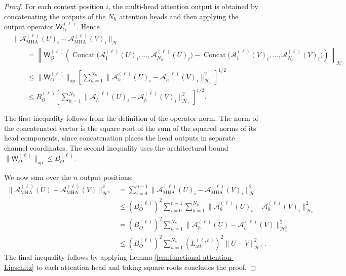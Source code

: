 \begin{proof}
For each context position \(i\), the multi-head attention output is obtained by concatenating the outputs of the \(N_h\) attention heads and then applying the output operator \(\mathsf W_O^{(\ell)}\). Hence
\[
\begin{aligned}
&\|\mathcal A_{\mathrm{MHA}}^{(\ell)}(U)_i-\mathcal A_{\mathrm{MHA}}^{(\ell)}(V)_i\|_{\mathcal H}\\
&\qquad=
\left\|
\mathsf W_O^{(\ell)}
\left(
\operatorname{Concat}
\bigl(
\mathcal A_1^{(\ell)}(U)_i,\ldots,\mathcal A_{N_h}^{(\ell)}(U)_i
\bigr)
-
\operatorname{Concat}
\bigl(
\mathcal A_1^{(\ell)}(V)_i,\ldots,\mathcal A_{N_h}^{(\ell)}(V)_i
\bigr)
\right)
\right\|_{\mathcal H}\\
&\qquad\leqslant
\|\mathsf W_O^{(\ell)}\|_{\mathrm{op}}
\left[
\sum_{h=1}^{N_h}
\|\mathcal A_h^{(\ell)}(U)_i-\mathcal A_h^{(\ell)}(V)_i\|_{\mathcal H_v}^2
\right]^{1/2}\\
&\qquad\leqslant
B_O^{(\ell)}
\left[
\sum_{h=1}^{N_h}
\|\mathcal A_h^{(\ell)}(U)_i-\mathcal A_h^{(\ell)}(V)_i\|_{\mathcal H_v}^2
\right]^{1/2}.
\end{aligned}
\]

The first inequality follows from the definition of the operator norm. The norm of the concatenated vector is the square root of the sum of the squared norms of its head components, since concatenation places the head outputs in separate channel coordinates. The second inequality uses the architectural bound \(\|\mathsf W_O^{(\ell)}\|_{\mathrm{op}}\leqslant B_O^{(\ell)}\).

We now sum over the \(n\) output positions:
\[
\begin{aligned}
\|\mathcal A_{\mathrm{MHA}}^{(\ell)}(U)-\mathcal A_{\mathrm{MHA}}^{(\ell)}(V)\|_{\mathcal H^n}^2&=
\sum_{i=0}^{n-1}
\|\mathcal A_{\mathrm{MHA}}^{(\ell)}(U)_i-\mathcal A_{\mathrm{MHA}}^{(\ell)}(V)_i\|_{\mathcal H}^2\\
&\leqslant
\left(B_O^{(\ell)}\right)^2
\sum_{i=0}^{n-1}
\sum_{h=1}^{N_h}
\|\mathcal A_h^{(\ell)}(U)_i-\mathcal A_h^{(\ell)}(V)_i\|_{\mathcal H_v}^2\\
&=
\left(B_O^{(\ell)}\right)^2
\sum_{h=1}^{N_h}
\|\mathcal A_h^{(\ell)}(U)-\mathcal A_h^{(\ell)}(V)\|_{\mathcal H_v^n}^2\\
&\leqslant
\left(B_O^{(\ell)}\right)^2
\sum_{h=1}^{N_h}
\left(L_{\mathrm{att}}^{(\ell,h)}\right)^2
\|U-V\|_{\mathcal H^n}^2.
\end{aligned}
\]
The final inequality follows by applying Lemma \ref{lem:functional-attention-Lipschitz} to each attention head and taking square roots concludes the proof.
\end{proof}

